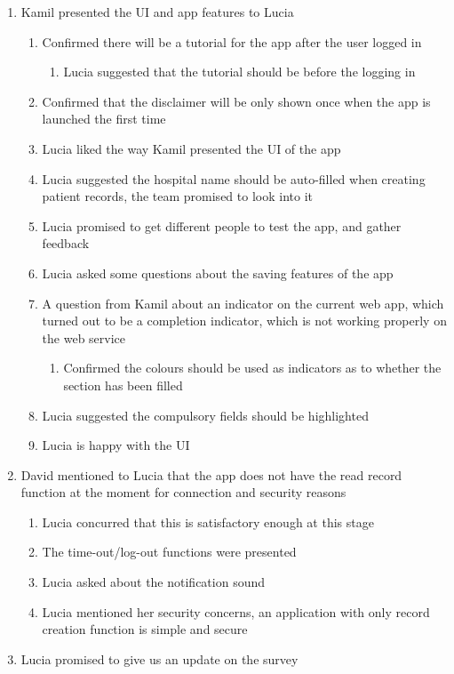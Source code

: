 \documentclass[12pt,a4paper,oneside,titlepage]{article}
\begin{document}
\begin{enumerate}
	\item Kamil presented the UI and app features to Lucia
	\begin{enumerate}
		\item Confirmed there will be a tutorial for the app after the user logged in 
		\begin{enumerate}
			\item Lucia suggested that the tutorial should be before the logging in 
		\end{enumerate}				
		\item Confirmed that the disclaimer will be only shown once when the app is launched the first time 
		\item Lucia liked the way Kamil presented the UI of the app 
		\item Lucia suggested the hospital name should be auto-filled when creating patient records, the team promised to look into it 
		\item Lucia promised to get different people to test the app, and gather feedback 
		\item Lucia asked some questions about the saving features of the app 
		\item A question from Kamil about an indicator on the current web app, which turned out to be a completion indicator, which is not working properly on the web service 
		\begin{enumerate}
			\item Confirmed the colours should be used as indicators as to whether the section has been filled 
		\end{enumerate}
	\item Lucia suggested the compulsory fields should be highlighted 
	\item Lucia is happy with the UI 
	\end{enumerate}
	\item David mentioned to Lucia that the app does not have the read record function at the moment for connection and security reasons 
	\begin{enumerate}
	\item Lucia concurred that this is satisfactory enough at this stage 
	\item The time-out/log-out functions were presented 
	\item Lucia asked about the notification sound 
	\item Lucia mentioned her security concerns, an application with only record creation function is simple and secure 
	\end{enumerate}
	\item Lucia promised to give us an update on the survey
\end{enumerate}
\end{document}
